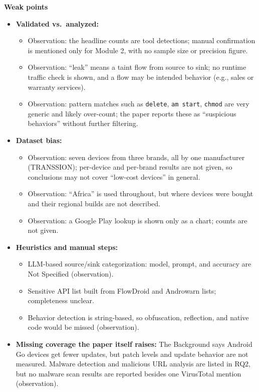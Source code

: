 \documentclass[11pt,a4paper]{article}
\begin{document}
\begin{enumerate}
    \vspace{4pt}
    \textbf{Weak points}
    \begin{itemize}[leftmargin=*,itemsep=1pt,topsep=2pt]
        \item \textbf{Validated vs.\ analyzed:}
        \begin{itemize}[itemsep=0pt]
            \item Observation: the headline counts are tool detections; manual confirmation is mentioned only for Module 2, with no sample size or precision figure.
            \item Observation: ``leak'' means a taint flow from source to sink; no runtime traffic check is shown, and a flow may be intended behavior (e.g., sales or warranty services).
            \item Observation: pattern matches such as \texttt{delete}, \texttt{am start}, \texttt{chmod} are very generic and likely over-count; the paper reports these as ``suspicious behaviors'' without further filtering.
        \end{itemize}
        \item \textbf{Dataset bias:}
        \begin{itemize}[itemsep=0pt]
            \item Observation: seven devices from three brands, all by one manufacturer (TRANSSION); per-device and per-brand results are not given, so conclusions may not cover ``low-cost devices'' in general.
            \item Observation: ``Africa'' is used throughout, but where devices were bought and their regional builds are not described.
            \item Observation: a Google Play lookup is shown only as a chart; counts are not given.
        \end{itemize}
        \item \textbf{Heuristics and manual steps:}
        \begin{itemize}[itemsep=0pt]
            \item LLM-based source/sink categorization: model, prompt, and accuracy are Not Specified (observation).
            \item Sensitive API list built from FlowDroid and Androwarn lists; completeness unclear.
            \item Behavior detection is string-based, so obfuscation, reflection, and native code would be missed (observation).
        \end{itemize}
        \item \textbf{Missing coverage the paper itself raises:} The Background says Android Go devices get fewer updates, but patch levels and update behavior are not measured. Malware detection and malicious URL analysis are listed in RQ2, but no malware scan results are reported besides one VirusTotal mention (observation).

\end{itemize}
\end{enumerate}
\end{document}
